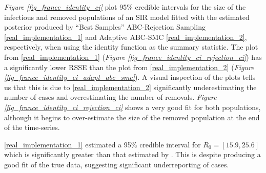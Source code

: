 \documentclass[11pt,a4paper]{article}
\theoremstyle{break}
\begin{document}
  \par \textit{Figure \ref{fig_france_identity_ci}} plot 95\% credible intervals for the size of the infectious and removed populations of an SIR model fitted with the estimated posterior produced by ``Best Samples'' ABC-Rejection Sampling \ref{real_implementation_1} and Adaptive ABC-SMC \ref{real_implementation_2}, respectively, when using the identity function as the summary statistic. The plot from \ref{real_implementation_1} (\textit{Figure \ref{fig_france_identity_ci_rejection_ci}}) has a significantly lower RSSE than the plot from \ref{real_implementation_2} (\textit{Figure \ref{fig_france_identity_ci_adapt_abc_smc}}). A visual inspection of the plots tells us that this is due to \ref{real_implementation_2} significantly underestimating the number of cases and overestimating the number of removals. \textit{Figure \ref{fig_france_identity_ci_rejection_ci}} shows a very good fit for both populations, although it begins to over-estimate the size of the removed population at the end of the time-series.

  \par \ref{real_implementation_1} estimated a 95\% credible interval for $R_0=[15.9,25.6]$ which is significantly greater than that estimated by \cite[]{estimated_r0_covid_19}. This is despite producing a good fit of the true data, suggesting significant underreporting of cases.
\end{document}
